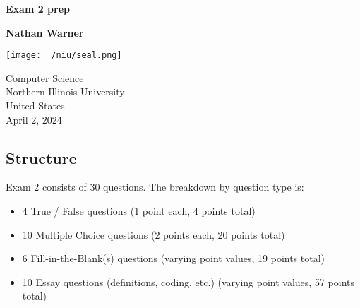 \documentclass{report}
\title{\Huge{}}
\author{\huge{Nathan Warner}}
\date{\huge{}}
\begin{document}
        \begin{titlepage}
       \begin{center}
           \vspace*{1cm}
    
           \textbf{Exam 2 prep}
    
           \vspace{0.5cm}
            
                
           \vspace{1.5cm}
    
           \textbf{Nathan Warner}
    
           \vfill
                
                
           \vspace{0.8cm}
         
           \texttt{[image: ~/niu/seal.png]}
                
           Computer Science \\
           Northern Illinois University\\
           United States\\
           April 2, 2024 
                
       \end{center}
    \end{titlepage}
    \tableofcontents
    \pagebreak 
    \bigbreak \noindent 
    \subsection{Structure}
    Exam 2 consists of 30 questions. The breakdown by question type is:
    \begin{itemize}
        \item 4 True / False questions (1 point each, 4 points total)
        \item 10 Multiple Choice questions (2 points each, 20 points total)
        \item 6 Fill-in-the-Blank(s) questions (varying point values, 19 points total)
        \item 10 Essay questions (definitions, coding, etc.) (varying point values, 57 points total)
    \end{itemize}
    \bigbreak \noindent 
\end{document}
